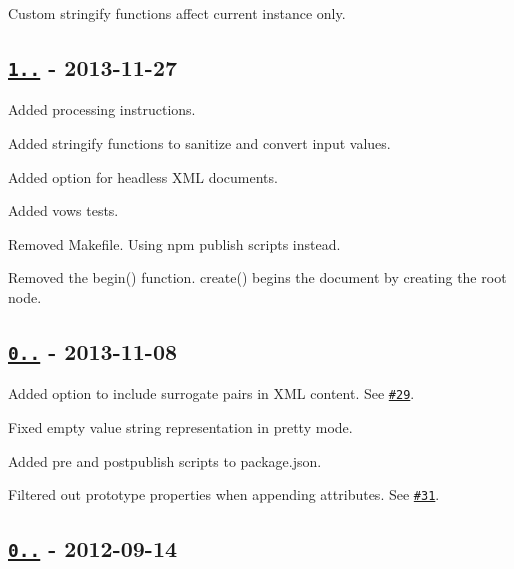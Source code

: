 \begin{DoxyItemize}
\item Custom stringify functions affect current instance only.
\end{DoxyItemize}

\subsection*{\href{https://github.com/oozcitak/xmlbuilder-js/compare/v0.4.3...v1.0.0}{\tt 1..} -\/ 2013-\/11-\/27}


\begin{DoxyItemize}
\item Added processing instructions.
\item Added stringify functions to sanitize and convert input values.
\item Added option for headless X\+ML documents.
\item Added vows tests.
\item Removed Makefile. Using npm publish scripts instead.
\item Removed the {\ttfamily begin()} function. {\ttfamily create()} begins the document by creating the root node.
\end{DoxyItemize}

\subsection*{\href{https://github.com/oozcitak/xmlbuilder-js/compare/v0.4.2...v0.4.3}{\tt 0..} -\/ 2013-\/11-\/08}


\begin{DoxyItemize}
\item Added option to include surrogate pairs in X\+ML content. See \href{https://github.com/oozcitak/xmlbuilder-js/issues/29}{\tt \#29}.
\item Fixed empty value string representation in pretty mode.
\item Added pre and postpublish scripts to package.\+json.
\item Filtered out prototype properties when appending attributes. See \href{https://github.com/oozcitak/xmlbuilder-js/issues/31}{\tt \#31}.
\end{DoxyItemize}

\subsection*{\href{https://github.com/oozcitak/xmlbuilder-js/compare/v0.4.1...v0.4.2}{\tt 0..} -\/ 2012-\/09-\/14}


